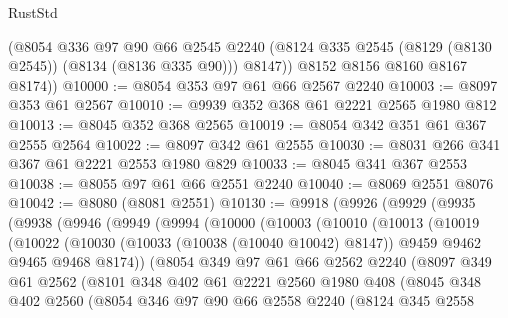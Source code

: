 \begin{lexlean}{RustStd}
\begin{coremodule}
          (@8054
            @336
            @97
            @90
            @66
            @2545
            @2240
            (@8124 @335 @2545 (@8129 (@8130 @2545)) (@8134 (@8136 @335 @90)))
            @8147))
        @8152
        @8156
        @8160
        @8167
        @8174))
@10000 := @8054 @353 @97 @61 @66 @2567 @2240
@10003 := @8097 @353 @61 @2567
@10010 := @9939 @352 @368 @61 @2221 @2565 @1980 @812
@10013 := @8045 @352 @368 @2565
@10019 := @8054 @342 @351 @61 @367 @2555 @2564
@10022 := @8097 @342 @61 @2555
@10030 := @8031 @266 @341 @367 @61 @2221 @2553 @1980 @829
@10033 := @8045 @341 @367 @2553
@10038 := @8055 @97 @61 @66 @2551 @2240
@10040 := @8069 @2551 @8076
@10042 := @8080 (@8081 @2551)
@10130 := @9918
    (@9926
      (@9929
        (@9935
          (@9938
            (@9946
              (@9949
                (@9994
                  (@10000
                    (@10003
                      (@10010
                        (@10013
                          (@10019
                            (@10022
                              (@10030
                                (@10033 (@10038 (@10040 @10042) @8147))
                                @9459
                                @9462
                                @9465
                                @9468
                                @8174))
                            (@8054
                              @349
                              @97
                              @61
                              @66
                              @2562
                              @2240
                              (@8097
                                @349
                                @61
                                @2562
                                (@8101
                                  @348
                                  @402
                                  @61
                                  @2221
                                  @2560
                                  @1980
                                  @408
                                  (@8045
                                    @348
                                    @402
                                    @2560
                                    (@8054
                                      @346
                                      @97
                                      @90
                                      @66
                                      @2558
                                      @2240
                                      (@8124
                                        @345
                                        @2558

\end{coremodule}
\end{lexlean}

